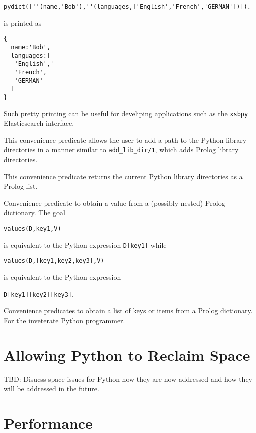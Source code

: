 \begin{description}
\begin{verbatim}
pydict([''(name,'Bob'),''(languages,['English','French','GERMAN'])]).
\end{verbatim}

\noindent
is printed as 
\begin{verbatim}
{
  name:'Bob',
  languages:[
   'English','
   'French',
   'GERMAN'
  ]
} 
\end{verbatim}

Such pretty printing can be useful for develiping applications such as
the {\tt xsbpy} Elasticsearch interface.

%
This convenience predicate allows the user to add a path to the Python
library directories in a manner similar to {\tt add\_lib\_dir/1},
which adds Prolog library directories.

%
This convenience predicate returns the current Python library
directories as a Prolog list.

%
  Convenience predicate to obtain a value from a (possibly nested)
  Prolog dictionary.  The goal

  {\tt values(D,key1,V)}

\noindent
  is equivalent to the
  Python expression {\tt D[key1]} while

  {\tt values(D,[key1,key2,key3],V)}

\noindent
is equivalent to the Python expression

{\tt D[key1][key2][key3]}.

%
Convenience predicates to obtain a list of keys or items from a Prolog
dictionary.  For the inveterate Python programmer.

\end{description}

\section{Allowing Python to Reclaim Space}
%
TBD: Disucss space issues for Python how they are now addressed and
how they will be addressed in the future.

\section{Performance}

